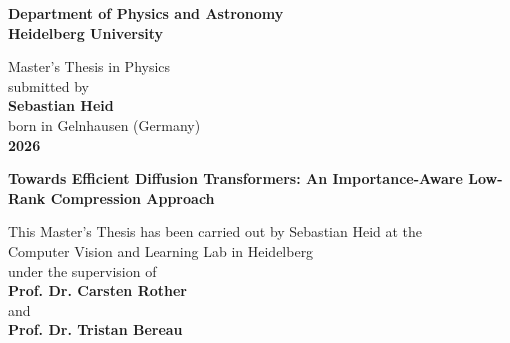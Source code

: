 \begin{titlepage}
\begin{center}
 
\Large\textbf{Department of Physics and Astronomy\\
Heidelberg University}

\vspace{18cm}

\normalsize
Master's Thesis in Physics\\
submitted by\\
\vspace{0.5cm}
\Large\textbf{Sebastian Heid}\\
\normalsize
\vspace{0.5cm}
born in Gelnhausen (Germany)\\
\vspace{0.5cm}
\Large\textbf{2026}
\normalsize


\newpage
\thispagestyle{empty}
\Large\textbf{Towards Efficient Diffusion Transformers: An Importance-Aware Low-Rank Compression Approach}
\vspace{18cm}

\normalsize
This Master's Thesis has been carried out by Sebastian Heid at the\\
Computer Vision and Learning Lab in Heidelberg\\
under the supervision of\\
\textbf{Prof. Dr. Carsten Rother} \\
and \\
\textbf{Prof. Dr. Tristan Bereau}
\vfill
\end{center}
\end{titlepage}

